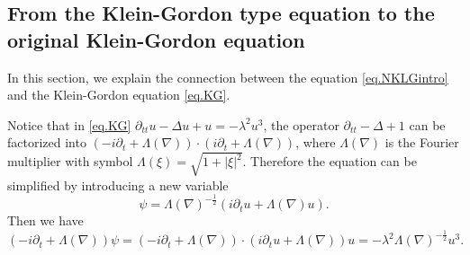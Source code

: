 



\subsection{From the Klein-Gordon type equation to the original Klein-Gordon equation}

In this section, we explain the connection between the equation \eqref{eq.NKLGintro} and the Klein-Gordon equation \eqref{eq.KG}.


Notice that in \eqref{eq.KG} $\partial_{tt} u - \Delta u +u = -\lambda^2 u^3$, the operator
$\partial_{tt}-\Delta +1$ can be factorized into $(-i\partial_t+\Lambda(\nabla))\cdot(i\partial_t+\Lambda(\nabla))$, where $\Lambda(\nabla)$ is the Fourier multiplier with symbol $\Lambda(\xi)=\sqrt{1+|\xi|^2}$. Therefore the equation can be simplified by introducing a new variable
\begin{equation}
    \psi=\Lambda(\nabla)^{-\frac{1}{2}}(i\partial_tu+\Lambda(\nabla)u).
\end{equation}
Then we have
\begin{equation}\label{eq.firstorderderivation}
    (-i\partial_t+\Lambda(\nabla))\psi=(-i\partial_t+\Lambda(\nabla))\cdot(i\partial_tu+\Lambda(\nabla))u=-\lambda^2 \Lambda(\nabla)^{-\frac{1}{2}} u^3.
\end{equation} 


